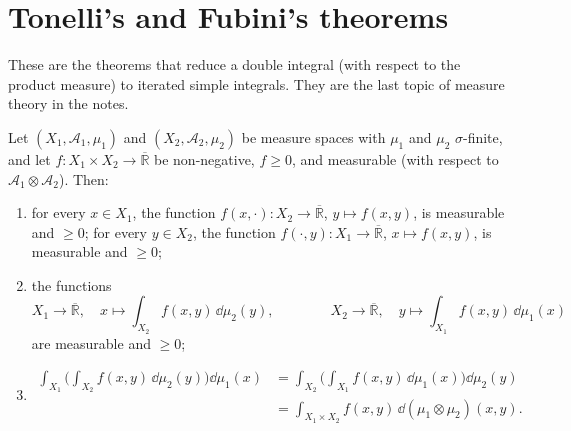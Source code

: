 
\section{Tonelli's and Fubini's theorems}\label{sec:pm-tonelli-fubini}

These are the theorems that reduce a double integral (with respect to the product measure)
to iterated simple integrals. They are the last topic of measure theory in the notes.

\begin{theorem}[Tonelli]\label{thm:pm-tonelli}
Let $(X_1,\mathcal A_1,\mu_1)$ and $(X_2,\mathcal A_2,\mu_2)$ be measure spaces with $\mu_1$
and $\mu_2$ $\sigma$-finite, and let $f:X_1\times X_2\to\overline{\mathbb R}$ be non-negative,
$f\ge0$, and measurable (with respect to $\mathcal A_1\otimes\mathcal A_2$). Then:
\begin{enumerate}[label=\arabic*)]
  \item for every $x\in X_1$, the function $f(x,\cdot):X_2\to\overline{\mathbb R}$,
    $y\mapsto f(x,y)$, is measurable and $\ge0$; for every $y\in X_2$, the function
    $f(\cdot,y):X_1\to\overline{\mathbb R}$, $x\mapsto f(x,y)$, is measurable and $\ge0$;
  \item the functions
    \[
      X_1\to\overline{\mathbb R},\quad x\mapsto\int_{X_2}f(x,y)\,\dd\mu_2(y),\qquad\qquad
      X_2\to\overline{\mathbb R},\quad y\mapsto\int_{X_1}f(x,y)\,\dd\mu_1(x)
    \]
    are measurable and $\ge0$;
  \item
    \[
    \begin{aligned}
      \int_{X_1}\Big(\int_{X_2}f(x,y)\,\dd\mu_2(y)\Big)\dd\mu_1(x)
      &=\int_{X_2}\Big(\int_{X_1}f(x,y)\,\dd\mu_1(x)\Big)\dd\mu_2(y)\\
      &=\int_{X_1\times X_2}f(x,y)\,\dd(\mu_1\otimes\mu_2)(x,y).
    \end{aligned}
    \]
\end{enumerate}
\end{theorem}

